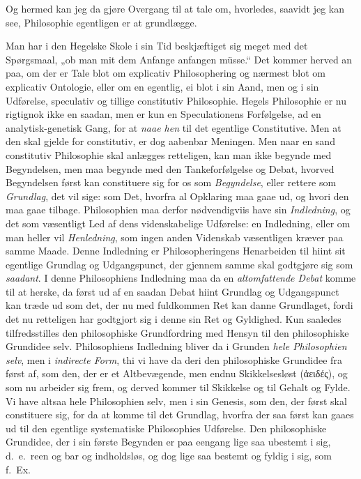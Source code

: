 \documentclass[12pt,a4paper]{book}
\newcommand{\apage}[1]{\marginnote{\footnotesize\textit{[#1]}}}
\begin{document}
Og hermed kan jeg da gjøre Overgang til at tale om, hvorledes, saavidt
jeg kan see, Philosophie egentligen er at grundlægge.

Man har i den Hegelske Skole i sin Tid beskjæftiget sig meget med det
Spørgsmaal, „ob man mit dem Anfange anfangen müsse.“ Det kommer herved
an paa, om der er Tale blot om explicativ Philosophering og nærmest
blot om explicativ Ontologie, eller om en egentlig, ei blot i sin
Aand, men og i sin Udførelse, speculativ og tillige constitutiv
Philosophie. Hegels Philosophie er nu rigtignok ikke en saadan, men er
kun en Speculationens Forfølgelse, ad en analytisk-genetisk Gang, for
at \emph{naae hen} til det egentlige Constitutive. Men at den skal gjelde for
constitutiv, er dog aabenbar Meningen. Men naar en sand constitutiv
Philosophie skal anlægges retteligen, kan man ikke begynde med
Begyndelsen, men maa begynde med den Tankeforfølgelse og Debat,
hvorved Begyndelsen først kan constituere sig for os som \emph{Begyndelse},
eller rettere som \emph{Grundlag}, det vil sige: som Det, \apage{45} hvorfra al Opklaring
maa gaae ud, og hvori den maa gaae tilbage. Philosophien maa derfor
nødvendigviis have sin \emph{Indledning}, og det som væsentligt Led af dens
videnskabelige Udførelse: en Indledning, eller om man heller vil
\emph{Henledning}, som ingen anden Videnskab væsentligen kræver paa samme
Maade. Denne Indledning er Philosopheringens Henarbeiden til hiint sit
egentlige Grundlag og Udgangspunct, der gjennem samme skal godtgjøre
sig som \emph{saadant}. I denne Philosophiens Indledning maa da en
\emph{altomfattende Debat} komme til at herske, da først ud af en saadan
Debat hiint Grundlag og Udgangspunct kan træde ud som det, der nu med
fuldkommen Ret kan danne Grundlaget, fordi det nu retteligen har
godtgjort sig i denne sin Ret og Gyldighed. Kun saaledes tilfredsstilles
den philosophiske Grundfordring med Hensyn til den philosophiske
Grundidee selv. Philosophiens Indledning bliver da i Grunden \emph{hele
Philosophien selv}, men i \emph{indirecte Form}, thi vi have da deri den
philosophiske Grundidee fra først af, som den, der er et Altbevægende,
men endnu Skikkelsesløst (ἀειδές), og som nu arbeider sig frem, og
derved kommer til Skikkelse og til Gehalt og Fylde. Vi have altsaa
hele Philosophien selv, men i sin Genesis, som den, der først skal
constituere sig, for da at komme til det Grundlag, hvorfra der saa
først kan gaaes ud til den egentlige systematiske Philosophies
Udførelse. Den philosophiske Grundidee, der i sin første Begynden er
paa eengang lige saa ubestemt i sig, d.\ e.\ reen og bar og
indholdsløs, og dog lige saa bestemt og fyldig i sig, som f.\ Ex.\
\end{document}
